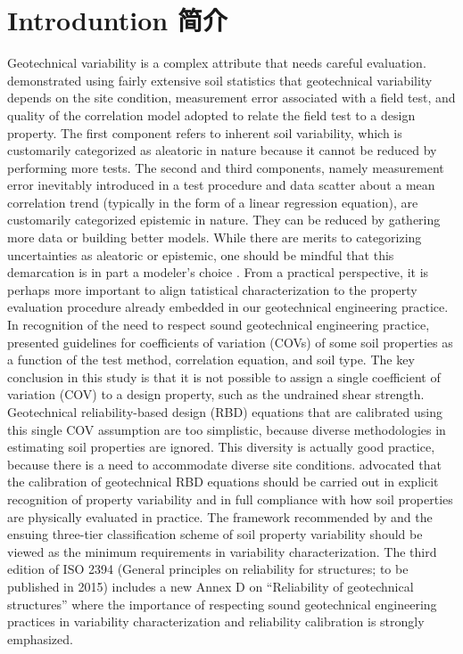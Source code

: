 \section{Introduntion 简介}

\begin{Parallel}{0.60\textwidth}{}
    \ParallelLText
    {
        Geotechnical variability is a complex attribute that needs careful evaluation. \citet{Phoon1999612} demonstrated using fairly extensive soil statistics that geotechnical variability depends on the site condition, measurement error associated with a field test, and quality of the correlation model adopted to relate the field test to a design property. The first component refers to inherent soil variability, which is customarily categorized as aleatoric in nature because it cannot be reduced by performing more tests. The second and third components, namely measurement error inevitably introduced in a test procedure and data scatter about a mean correlation trend (typically in the form of a linear regression equation), are customarily categorized epistemic in nature. They can be reduced by gathering more data or building better models. While there are merits to categorizing uncertainties as aleatoric or epistemic, one should be mindful that this demarcation is in part a modeler’s choice \citep{DerKiureghian2007}. From a practical perspective, it is perhaps more important to align tatistical characterization to the property evaluation procedure already embedded in our geotechnical engineering practice. In recognition of the need to respect sound geotechnical engineering practice, \citet{Phoon1999625} presented guidelines for coefficients of variation (COVs) of some soil properties as a function of the test method, correlation equation, and soil type. The key conclusion in this study is that it is not possible to assign a single coefficient of variation (COV) to a design property, such as the undrained shear strength. Geotechnical reliability-based design (RBD) equations that are calibrated using this single COV assumption are too simplistic, because diverse methodologies in estimating soil properties are ignored. This diversity is actually good practice, because there is a need to accommodate diverse site conditions. \citet{Phoon1999612,Phoon1999625} advocated that the calibration of geotechnical RBD equations should be carried out in explicit recognition of property variability and in full compliance with how soil properties are physically evaluated in practice. The framework recommended by \citet{Phoon1999612,Phoon1999625} and the ensuing three-tier classification scheme of soil property variability \citep{Phoon2008344} should be viewed as the minimum requirements in variability characterization. The third edition of ISO 2394 (General principles on reliability for structures; to be published in 2015) includes a new Annex D on “Reliability of geotechnical structures” where the importance of respecting sound geotechnical engineering practices in variability characterization and reliability calibration is strongly emphasized.
}
\end{Parallel}
